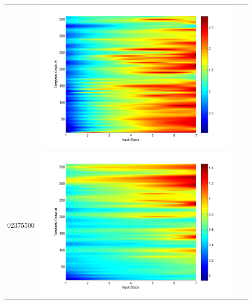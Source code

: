 \documentclass[11pt]{article}
\begin{document}
\begin{table}[H]
{\begin{tabular}{c  c   c   c  }
&\begin{minipage}{.3\textwidth}\includegraphics[width=\linewidth]{resultgraph/02329000pepq.png}\end{minipage}
\\
02375500&\begin{minipage}{.3\textwidth}\includegraphics[width=\linewidth]{resultgraph/02375500p.png}\end{minipage}

\end{tabular}}
\end{table}
\end{document}
